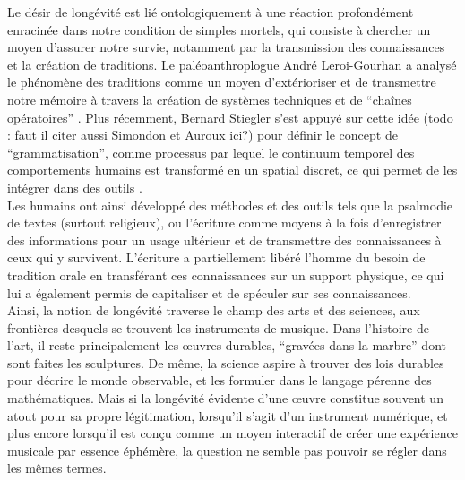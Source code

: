 \indent Le désir de longévité est lié ontologiquement à une réaction profondément enracinée dans notre condition de simples mortels, qui consiste à chercher un moyen d'assurer notre survie, notamment par la transmission des connaissances et la création de traditions. Le paléoanthroplogue André Leroi-Gourhan a analysé le phénomène des traditions comme un moyen d'extérioriser et de transmettre notre mémoire à travers la création de systèmes techniques et de ``chaînes opératoires'' \cite{leroi-gourhan_geste_1964}. Plus récemment, Bernard Stiegler s'est appuyé sur cette idée (todo : faut il citer aussi Simondon et Auroux ici?) pour définir le concept de ``grammatisation'', comme processus par lequel le continuum temporel des comportements humains est transformé en un spatial discret, ce qui permet de les intégrer dans des outils \cite{stiegler_for_2010}.\\
\indent Les humains ont ainsi développé des méthodes et des outils tels que la psalmodie de textes (surtout religieux), ou l'écriture comme moyens à la fois d'enregistrer des informations pour un usage ultérieur et de transmettre des connaissances à ceux qui y survivent. L'écriture a partiellement libéré l'homme du besoin de tradition orale en transférant ces connaissances sur un support physique, ce qui lui a également permis de capitaliser et de spéculer sur ses connaissances.\\
\indent Ainsi, la notion de longévité traverse le champ des arts et des sciences, aux frontières desquels se trouvent les instruments de musique. Dans l'histoire de l'art, il reste principalement les œuvres durables, ``gravées dans la marbre'' dont sont faites les sculptures. De même, la science aspire à trouver des lois durables pour décrire le monde observable, et les formuler dans le langage pérenne des mathématiques. Mais si la longévité évidente d'une œuvre constitue souvent un atout pour sa propre légitimation, lorsqu'il s'agit d'un instrument numérique, et plus encore lorsqu'il est conçu comme un moyen interactif de créer une expérience musicale par essence éphémère, la question ne semble pas pouvoir se régler dans les mêmes termes.\\

	
